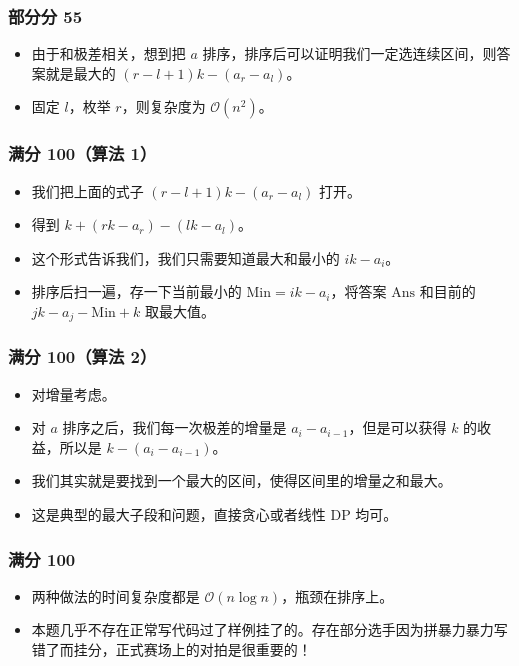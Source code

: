 \documentclass[aspectratio=169]{ctexbeamer}
\begin{document}
\begin{frame}
  \frametitle{部分分 55}

  \begin{itemize}
    \item <1 - > 由于和极差相关，想到把 $a$ 排序，排序后可以证明我们一定选连续区间，则答案就是最大的 $(r-l+1)k-(a_r-a_l)$。
    \item <2 - > 固定 $l$，枚举 $r$，则复杂度为 $\mathcal O(n^2)$。
  \end{itemize}
\end{frame}

\begin{frame}
  \frametitle{满分 100（算法 1）}
  \begin{itemize}
    \item <1 - > 我们把上面的式子 $(r-l+1)k-(a_r-a_l)$ 打开。
    \item <2 - > 得到 $k+(rk-a_r)-(lk-a_l)$。
    \item <3 - > 这个形式告诉我们，我们只需要知道最大和最小的 $ik-a_i$。
    \item <4 - > 排序后扫一遍，存一下当前最小的 $\mathrm{Min}=ik-a_i$，将答案 $\mathrm{Ans}$ 和目前的 $jk-a_j-\mathrm{Min}+k$ 取最大值。
  \end{itemize}
\end{frame}

\begin{frame}
  \frametitle{满分 100（算法 2）}
  \begin{itemize}
    \item <1 - > 对增量考虑。
    \item <2 - > 对 $a$ 排序之后，我们每一次极差的增量是 $a_i-a_{i-1}$，但是可以获得 $k$ 的收益，所以是 $k-(a_i-a_{i-1})$。
    \item <3 - > 我们其实就是要找到一个最大的区间，使得区间里的增量之和最大。
    \item <4 - > 这是典型的最大子段和问题，直接贪心或者线性 DP 均可。
  \end{itemize}
\end{frame}

\begin{frame}
  \frametitle{满分 100}
  \begin{itemize}
    \item <1 - > 两种做法的时间复杂度都是 $\mathcal O(n\log n)$，瓶颈在排序上。
    \item <2 - > 本题几乎不存在正常写代码过了样例挂了的。存在部分选手因为拼暴力暴力写错了而挂分，正式赛场上的对拍是很重要的！
  \end{itemize}
\end{frame}
\end{document}
